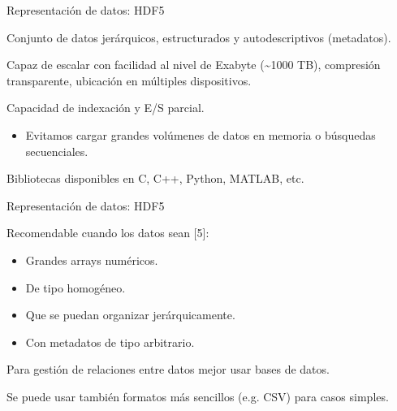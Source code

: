 
\begin{frame}{Representación de datos: HDF5}
 \begin{wideitemize}
  \item Conjunto de datos jerárquicos, estructurados y autodescriptivos (metadatos).
  \item Capaz de escalar con facilidad al nivel de Exabyte (\textasciitilde1000 TB), compresión
  transparente, ubicación en múltiples dispositivos.
  \item Capacidad de indexación y E/S parcial.
  \begin{itemize}
   \item Evitamos cargar grandes volúmenes de datos en memoria o búsquedas secuenciales.
  \end{itemize}
  
  \item Bibliotecas disponibles en C, C++, Python, MATLAB, etc. 

 \end{wideitemize}

\end{frame}


\begin{frame}{Representación de datos: HDF5}
 \begin{wideitemize}
  \item Recomendable cuando los datos sean [5]:
  \begin{itemize}
   \item Grandes arrays numéricos.
   \item De tipo homogéneo.
   \item Que se puedan organizar jerárquicamente.
   \item Con metadatos de tipo arbitrario.
  \end{itemize}
  
  \item Para gestión de relaciones entre datos mejor usar bases de datos.
  \item Se puede usar también formatos más sencillos (e.g. CSV) para casos
  simples.

 \end{wideitemize}

\end{frame}


